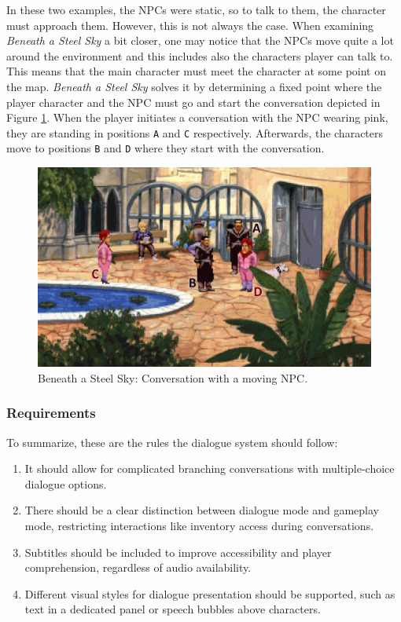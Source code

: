 In these two examples, the NPCs were static, so to talk to them, the character must approach them. However, this is not always the case. When examining \textit{Beneath a Steel Sky} a bit closer, one may notice that the NPCs move quite a lot around the environment and this includes also the characters player can talk to. This means that the main character must meet the character at some point on the map. \textit{Beneath a Steel Sky} solves it by determining a fixed point where the player character and the NPC must go and start the conversation depicted in Figure \ref{fig:C-BaSS3}. When the player initiates a conversation with the NPC wearing pink, they are standing in positions \texttt{A} and \texttt{C} respectively. Afterwards, the characters move to positions \texttt{B} and \texttt{D} where they start with the conversation.

\begin{figure}[H]
\centering
\includegraphics[width=.8\linewidth]{img/C-BaSS2.png}
\caption{Beneath a Steel Sky: Conversation with a moving NPC.}
\label{fig:C-BaSS3}
\end{figure}

\subsubsection{Requirements}
To summarize, these are the rules the dialogue system should follow:

\begin{enumerate}[label=\color{teal}\textbf{R{\arabic*}},resume]
  \item \label{intro:req:multi_dialogue} It should allow for complicated branching conversations with multiple-choice dialogue options.
  \item \label{intro:req:modes} There should be a clear distinction between dialogue mode and gameplay mode, restricting interactions like inventory access during conversations.
  \item \label{intro:req:subs} Subtitles should be included to improve accessibility and player comprehension, regardless of audio availability.
  \item \label{intro:req:sub_format} Different visual styles for dialogue presentation should be supported, such as text in a dedicated panel or speech bubbles above characters.
\end{enumerate}


